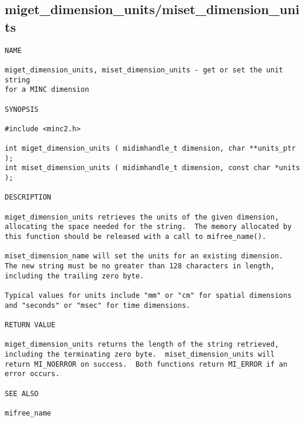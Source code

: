 \documentclass{article}
\begin{document}
\subsection{miget\_dimension\_units/miset\_dimension\_units}
\begin{verbatim}
NAME

miget_dimension_units, miset_dimension_units - get or set the unit string
for a MINC dimension

SYNOPSIS

#include <minc2.h>

int miget_dimension_units ( midimhandle_t dimension, char **units_ptr );
int miset_dimension_units ( midimhandle_t dimension, const char *units );

DESCRIPTION

miget_dimension_units retrieves the units of the given dimension,
allocating the space needed for the string.  The memory allocated by
this function should be released with a call to mifree_name().

miset_dimension_name will set the units for an existing dimension.
The new string must be no greater than 128 characters in length,
including the trailing zero byte.

Typical values for units include "mm" or "cm" for spatial dimensions
and "seconds" or "msec" for time dimensions.

RETURN VALUE

miget_dimension_units returns the length of the string retrieved,
including the terminating zero byte.  miset_dimension_units will
return MI_NOERROR on success.  Both functions return MI_ERROR if an
error occurs.

SEE ALSO

mifree_name
\end{verbatim}
\end{document}
